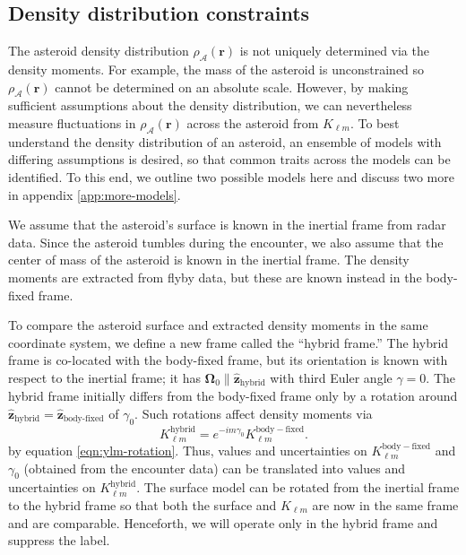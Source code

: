 \documentclass[fleqn,usenatbib]{mnras}
\newcommand{\unit}[1]{\bm{\hat{#1}}}
\begin{document}
\subsection{Density distribution constraints}
\label{sec:density-distro}

The asteroid density distribution $\rho_\mathcal{A}(\bm r)$ is not uniquely determined via the density moments. For example, the mass of the asteroid is unconstrained so $\rho_\mathcal{A}(\bm r)$ cannot be determined on an absolute scale. However, by making sufficient assumptions about the density distribution, we can nevertheless measure fluctuations in $\rho_\mathcal{A}(\bm r)$ across the asteroid from $K_{\ell m}$. To best understand the density distribution of an asteroid, an ensemble of models with differing assumptions is desired, so that common traits across the models can be identified. To this end, we outline two possible models here and discuss two more in appendix \ref{app:more-models}.

We assume that the asteroid's surface is known in the inertial frame from radar data. Since the asteroid tumbles during the encounter, we also assume that the center of mass of the asteroid is known in the inertial frame. The density moments are extracted from flyby data, but these are known instead in the body-fixed frame.

To compare the asteroid surface and extracted density moments in the same coordinate system, we define a new frame called the ``hybrid frame.'' The hybrid frame is co-located with the body-fixed frame, but its orientation is known with respect to the inertial frame; it has $\bm \Omega_0 \parallel \unit z_\text{hybrid}$ with third Euler angle $\gamma = 0$. The hybrid frame initially differs from the body-fixed frame only by a rotation around $\unit z_\text{hybrid}=\unit z_\text{body-fixed}$ of $\gamma_0$. Such rotations affect density moments via 
\begin{equation}
  K_{\ell m}^\mathrm{hybrid} = e^{-im\gamma_0}K_{\ell m}^\mathrm{body-fixed}.
  \label{eqn:body-fixed-to-hybrid}
\end{equation}
by equation \ref{eqn:ylm-rotation}. Thus, values and  uncertainties on $K_{\ell m}^\mathrm{body-fixed}$ and $\gamma_0$ (obtained from the encounter data) can be translated into values and uncertainties on $K_{\ell m}^\mathrm{hybrid}$. The surface model can be rotated from the inertial frame to the hybrid frame so that both the surface and $K_{\ell m}$ are now in the same frame and are comparable. Henceforth, we will operate only in the hybrid frame and suppress the label.
\end{document}
